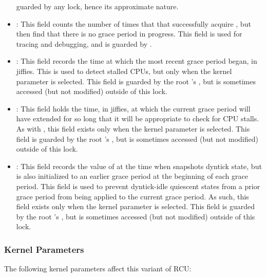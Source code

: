 \begin{itemize}
	guarded by any lock, hence its approximate nature.
\item	{}:
	This field counts the number of times that
	 that successfully acquire
	, but then find that there is no grace period
	in progress.
	This field is used for tracing and debugging, and
	is guarded by .
\item	{}:
	This field records the time at which the most recent grace period
	began, in jiffies.
	This is used to detect stalled CPUs, but only when the
	 kernel parameter is selected.
	This field is guarded by the root 's ,
	but is sometimes accessed (but not modified) outside of this
	lock.
\item	{}:
	This field holds the time, in jiffies, at which the current
	grace period will have extended for so long that it will
	be appropriate to check for CPU stalls.
	As with , this field exists only when the
	 kernel parameter is selected.
	This field is guarded by the root 's ,
	but is sometimes accessed (but not modified) outside of this
	lock.
\item	{}:
	This field records the value of  at the time when
	 snapshots dyntick state, but
	is also initialized to an earlier grace period at the beginning
	of each grace period.
	This field is used to prevent dyntick-idle quiescent states
	from a prior grace period from being applied to the current
	grace period.
	As such, this field exists only when the 
	kernel parameter is selected.
	This field is guarded by the root 's ,
	but is sometimes accessed (but not modified) outside of this
	lock.
\end{itemize}

\subsubsection{Kernel Parameters}
\label{app:rcuimpl:rcutreewt:Kernel Parameters}

The following kernel parameters affect this variant of RCU:

